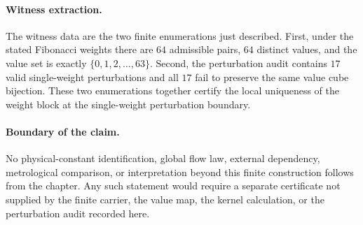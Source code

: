\paragraph{Witness extraction.}
The witness data are the two finite enumerations just described. First, under the stated Fibonacci weights there are $64$ admissible pairs, $64$ distinct values, and the value set is exactly $\{0,1,2,\ldots,63\}$. Second, the perturbation audit contains $17$ valid single-weight perturbations and all $17$ fail to preserve the same value cube bijection. These two enumerations together certify the local uniqueness of the weight block at the single-weight perturbation boundary.

\paragraph{Boundary of the claim.}
No physical-constant identification, global flow law, external dependency, metrological comparison, or interpretation beyond this finite construction follows from the chapter. Any such statement would require a separate certificate not supplied by the finite carrier, the value map, the kernel calculation, or the perturbation audit recorded here.
